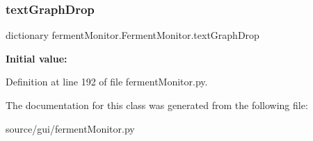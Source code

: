 \subsubsection{\texorpdfstring{textGraphDrop}{textGraphDrop}}
{\footnotesize\ttfamily dictionary ferment\+Monitor.\+Ferment\+Monitor.\+text\+Graph\+Drop\hspace{0.3cm}{\ttfamily [static]}}

{\bfseries Initial value\+:}
\begin{DoxyCode}{0}
\DoxyCodeLine{=  \{}
\DoxyCodeLine{        \textcolor{stringliteral}{"Temperature"}: \textcolor{stringliteral}{"Temp"},}
\DoxyCodeLine{        \textcolor{stringliteral}{"Specific Gravity"} : \textcolor{stringliteral}{"Sg"},}
\DoxyCodeLine{        \textcolor{stringliteral}{"Volume"} : \textcolor{stringliteral}{"Volume"}}
\DoxyCodeLine{    \}}

\end{DoxyCode}


Definition at line 192 of file ferment\+Monitor.\+py.



The documentation for this class was generated from the following file\+:\begin{DoxyCompactItemize}
\item 
source/gui/ferment\+Monitor.\+py\end{DoxyCompactItemize}
